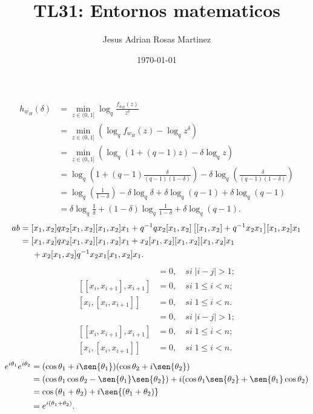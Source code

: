 \documentclass[12pt]{article}
\title{TL31: Entornos matematicos}
\author{Jesus Adrian Rosas Martinez}
\date{\small{\today}}
\begin{document}
\maketitle %

\begin{align*} %
h_{w_{H}}{(\delta)}&=\min_{z\in(0,1]}{\log_{q}}{\frac{f_{w_{H}}{(z)}}{z^{\delta}}}\\
&=\min_{z\in(0,1]}{(\log_{q}{f_{w_{H}}{(z)}}-\log_{q}{z^{\delta}})}\\
&=\min_{z\in(0,1]}{(\log_{q}{(1+(q-1)z)}-\delta\log_{q}{z})}\\
&=\log_{q}{\left(1+(q-1)\frac{\delta}{(q-1)(1-\delta)}\right)}-\delta\log_{q}{\left(\frac{\delta}{(q-1)(1-\delta)}\right)}\\
&=\log_{q}{\left(\frac{1}{1-\delta}\right)}-\delta\log_{q}{\delta}+\delta\log_{q}{(q-1)}+\delta\log_{q}{(q-1)}\\
&=\delta\log_{q}{\frac{1}{\delta}}+(1-\delta)\log_{q}{\frac{1}{1-\delta}}+\delta\log_{q}{(q-1)}.
\end{align*}
\begin{align*} %
ab&={[x_{1},x_{2}]qx_{2}[x_{1},x_{2}][x_{1},x_{2}]x_{1}}+{q^{-1}qx_{2}{[x_{1},x_{2}]\left[[x_{1},x_{2}]+q^{-1}x_{2}x_{1}\right]}[x_{1},x_{2}]x_{1}}\\
&={[x_{1},x_{2}]qx_{2}[x_{1},x_{2}][x_{1},x_{2}]x_{1}}+{x_{2}[x_{1},x_{2}][x_{1},x_{2}][x_{1},x_{2}]x_{1}}\\
&\hspace{5mm}+{x_{2}[x_{1},x_{2}]q^{-1}x_{2}x_{1}[x_{1},x_{2}]x_{1}}.
\end{align*}
\begin{align} %
[x_{i},x_{j}]&=0,\quad si\;|i-j|>1;\\
\left[[x_{i},x_{i+1}],x_{i+1}\right]&=0,\quad si\;1\leq{i}<n;\\
\left[x_{i},[x_{i},x_{i+1}]\right]&=0,\quad si\;1\leq{i}<n.
\end{align}
\begin{align} %
[x_{i},x_{j}]&=0,\quad si\;|i-j|>1;\nonumber\\
\left[[x_{i},x_{i+1}],x_{i+1}\right]&=0,\quad si\;1\leq{i}<n;\nonumber\\
\left[x_{i},[x_{i},x_{i+1}]\right]&=0,\quad si\;1\leq{i}<n.
\end{align}
\begin{align*} %
e^{i\theta_{1}}e^{i\theta_{2}}&=(\cos{\theta_{1}}+i\sen{\theta_{1}})(\cos{\theta_{2}}+i\sen{\theta_{2}})\\
&=(\cos{\theta_{1}}\cos{\theta_{2}}-\sen{\theta_{1}}\sen{\theta_{2}})+i(\cos{\theta_{1}}\sen{\theta_{2}}+\sen{\theta_{1}}\cos{\theta_{2}})\\
&=\cos{({\theta_{1}}+{\theta_{2}})}+i\sen{({\theta_{1}}+{\theta_{2}})}\\
&=e^{i({\theta_{1}}+{\theta_{2}})}.
\end{align*}
\end{document}
